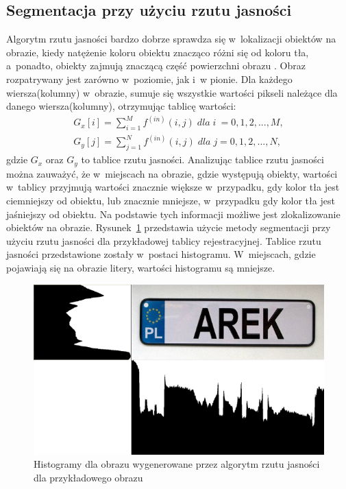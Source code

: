 \subsection{Segmentacja przy użyciu rzutu jasności} \label{ssec:rzut_jasnosci}
Algorytm rzutu jasności bardzo dobrze sprawdza się w~lokalizacji obiektów na obrazie, kiedy natężenie koloru obiektu znacząco różni się od koloru tła, a~ponadto, obiekty zajmują znaczącą część powierzchni obrazu \cite{barroso97}. Obraz rozpatrywany jest zarówno w~poziomie, jak i~w pionie. Dla każdego wiersza(kolumny) w~obrazie, sumuje się wszystkie wartości pikseli należące dla danego wiersza(kolumny), otrzymując tablicę wartości:
\begin{gather*}
  G_x[i] = \sum\limits_{i=1}^M f^{(in)}(i, j) \; dla \; i~= 0,1,2,...,M, \\
  G_y[j] = \sum\limits_{j=1}^N f^{(in)}(i, j) \; dla \; j = 0,1,2,...,N,
\end{gather*} gdzie $G_x$ oraz $G_y$ to tablice rzutu jasności. Analizując tablice rzutu jasności można zauważyć, że w~miejscach na obrazie, gdzie występują obiekty, wartości w~tablicy przyjmują wartości znacznie większe w~przypadku, gdy kolor tła jest ciemniejszy od obiektu, lub znacznie mniejsze, w~przypadku gdy kolor tła jest jaśniejszy od obiektu. Na podstawie tych informacji możliwe jest zlokalizowanie obiektów na obrazie. Rysunek~\ref{fig:rzut_jasnosci} przedstawia użycie metody segmentacji przy użyciu rzutu jasności dla przykładowej tablicy rejestracyjnej. Tablice rzutu jasności przedstawione zostały w~postaci histogramu. W~miejscach, gdzie pojawiają się na obrazie litery, wartości histogramu są mniejsze.

\begin{figure}
  \centering
  \includegraphics[width=15cm]{img/rzut-jasnosci}
  \caption{Histogramy dla obrazu wygenerowane przez algorytm rzutu jasności dla przykładowego obrazu}
  \label{fig:rzut_jasnosci}
\end{figure}
